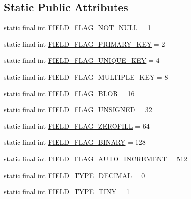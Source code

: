 \subsection*{Static Public Attributes}
\begin{DoxyCompactItemize}
\item 
static final int \mbox{\hyperlink{enumcom_1_1mysql_1_1cj_1_1_mysql_type_a46a9fa53a19cf146d0a24cc47e1cb41f}{F\+I\+E\+L\+D\+\_\+\+F\+L\+A\+G\+\_\+\+N\+O\+T\+\_\+\+N\+U\+LL}} = 1
\item 
static final int \mbox{\hyperlink{enumcom_1_1mysql_1_1cj_1_1_mysql_type_afa431b700b411009900c1afe8017ab1c}{F\+I\+E\+L\+D\+\_\+\+F\+L\+A\+G\+\_\+\+P\+R\+I\+M\+A\+R\+Y\+\_\+\+K\+EY}} = 2
\item 
static final int \mbox{\hyperlink{enumcom_1_1mysql_1_1cj_1_1_mysql_type_af918093f9f3d51e96214da1cbd311a34}{F\+I\+E\+L\+D\+\_\+\+F\+L\+A\+G\+\_\+\+U\+N\+I\+Q\+U\+E\+\_\+\+K\+EY}} = 4
\item 
static final int \mbox{\hyperlink{enumcom_1_1mysql_1_1cj_1_1_mysql_type_aec1860d4e7c1d1a65fa299ea9704c9d2}{F\+I\+E\+L\+D\+\_\+\+F\+L\+A\+G\+\_\+\+M\+U\+L\+T\+I\+P\+L\+E\+\_\+\+K\+EY}} = 8
\item 
static final int \mbox{\hyperlink{enumcom_1_1mysql_1_1cj_1_1_mysql_type_ada7ab8554e0037f2782e4c577fb0ab3c}{F\+I\+E\+L\+D\+\_\+\+F\+L\+A\+G\+\_\+\+B\+L\+OB}} = 16
\item 
static final int \mbox{\hyperlink{enumcom_1_1mysql_1_1cj_1_1_mysql_type_a2c6701614559b1ad9955cdc4ca6337e2}{F\+I\+E\+L\+D\+\_\+\+F\+L\+A\+G\+\_\+\+U\+N\+S\+I\+G\+N\+ED}} = 32
\item 
static final int \mbox{\hyperlink{enumcom_1_1mysql_1_1cj_1_1_mysql_type_abb76a1f2f3dac9a30d1b559b8ba66a48}{F\+I\+E\+L\+D\+\_\+\+F\+L\+A\+G\+\_\+\+Z\+E\+R\+O\+F\+I\+LL}} = 64
\item 
static final int \mbox{\hyperlink{enumcom_1_1mysql_1_1cj_1_1_mysql_type_a10fbfe5535ddc1ed2bcbbb445fd48c91}{F\+I\+E\+L\+D\+\_\+\+F\+L\+A\+G\+\_\+\+B\+I\+N\+A\+RY}} = 128
\item 
static final int \mbox{\hyperlink{enumcom_1_1mysql_1_1cj_1_1_mysql_type_a463794129f72400e3cbbffc8072485fe}{F\+I\+E\+L\+D\+\_\+\+F\+L\+A\+G\+\_\+\+A\+U\+T\+O\+\_\+\+I\+N\+C\+R\+E\+M\+E\+NT}} = 512
\item 
static final int \mbox{\hyperlink{enumcom_1_1mysql_1_1cj_1_1_mysql_type_a2cbe87788a125a2d10a98d09de7650a7}{F\+I\+E\+L\+D\+\_\+\+T\+Y\+P\+E\+\_\+\+D\+E\+C\+I\+M\+AL}} = 0
\item 
static final int \mbox{\hyperlink{enumcom_1_1mysql_1_1cj_1_1_mysql_type_a5d895223f069be6274a3b4dc106e5ae9}{F\+I\+E\+L\+D\+\_\+\+T\+Y\+P\+E\+\_\+\+T\+I\+NY}} = 1

\end{DoxyCompactItemize}
